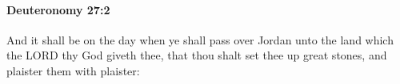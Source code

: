 
		\paragraph{Deuteronomy 27:2} %
			\label{DEUTERONOMY-27-2}

			And it shall be on the day when ye shall pass over Jordan unto the land which the LORD thy God giveth thee, that thou shalt set thee up great stones, and plaister them with plaister:


